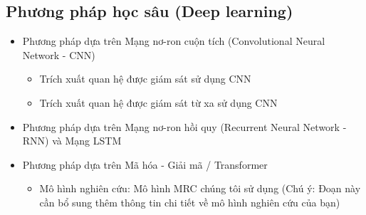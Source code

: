 \subsection{Phương pháp học sâu (Deep learning)}\label{subsec:phuong-phap-hoc-sau-(deep-learning)}
\begin{itemize}
    \item Phương pháp dựa trên Mạng nơ-ron cuộn tích (Convolutional Neural Network - CNN)
    \begin{itemize}
        \item Trích xuất quan hệ được giám sát sử dụng CNN
        \item Trích xuất quan hệ được giám sát từ xa sử dụng CNN
    \end{itemize}
    \item Phương pháp dựa trên Mạng nơ-ron hồi quy (Recurrent Neural Network - RNN) và Mạng LSTM
    \item Phương pháp dựa trên Mã hóa - Giải mã / Transformer
    \begin{itemize}
        \item Mô hình nghiên cứu: Mô hình MRC chúng tôi sử dụng (Chú ý: Đoạn này cần bổ sung thêm thông tin chi tiết về mô hình nghiên cứu của bạn)
    \end{itemize}
\end{itemize}